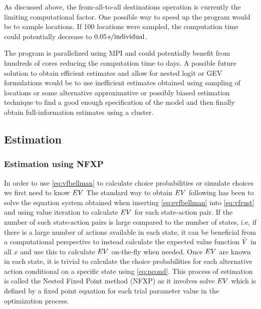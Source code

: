 As discussed above, the from-all-to-all destinations operation is currently the limiting computational factor. One possible way to speed up the program would be to sample locations. If 100 locations were sampled, the computation time could potentially decrease to $0.05\, \mathrm{s/individual}$.  

The program is parallelized using MPI and could potentially benefit from hundreds of cores reducing the computation time to days. A possible future solution to obtain efficient estimates and allow for nested logit or GEV formulations would be to use inefficient estimates obtained using sampling of locations or some alternative approximative or possibly biased estimation technique to find a good enough specification of the model and then finally obtain full-information estimates using a cluster. 




\subsection{Estimation}
\subsubsection{Estimation using NFXP}
In order to use \eqref{eq:vfbellman} to calculate choice probabilities or simulate choices we first need to know $EV$ 
The standard way to obtain $EV$ following \citet{Rust87} has been to solve the equation system obtained when inserting \eqref{eq:evfbellman} into \eqref{eq:vfrust} and using value iteration to calculate $EV$ for each state-action pair.   
If the number of such state-action pairs is large compared to the number of states, i.e, if there is a large number of actions available in each state, it can be beneficial from a computational perspective to instead calculate the expected value function $\bar{V}$ in all $x$ and use this to calculate $EV$ on-the-fly when needed. Once $EV$ are known in each state, it is trivial to calculate the choice probabilities for each alternative action conditional on a specific state using \eqref{eq:pcond}. This process of estimation is called the Nested Fixed Point method (NFXP) as it involves solve $EV$ which is defined by a fixed point equation for each trial parameter value in the optimization process. 

